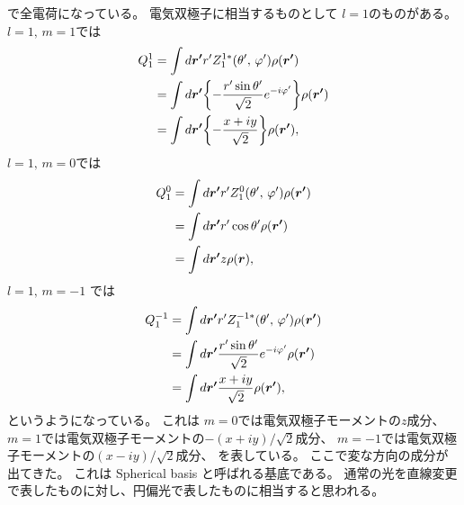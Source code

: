 \documentclass[../../master.tex]{subfiles}
\begin{document}
で全電荷になっている。
電気双極子に相当するものとして
\(l=1\)のものがある。
\(l=1,\,m = 1\)では
\begin{equation}\begin{aligned}[b]
     Q_1^{ 1}
    &= \int d\vb*{r'}  r' Z_1^{1*} (\theta',\,\varphi') \rho(\vb*{r'})\\
    &= \int d\vb*{r'} \qty{- \frac{r'\sin\theta'}{\sqrt{2}}e^{- i\varphi'}} \rho(\vb*{r'})\\
    &= \int d\vb*{r'} \qty{- \frac{x+iy}{\sqrt{2}}} \rho(\vb*{r'}),
\end{aligned}\end{equation}
\(l=1,\,m=0\)では
\begin{equation}\begin{aligned}[b]
    Q_1^0
    &= \int d\vb*{r'}  r' Z_1^0 (\theta',\,\varphi') \rho(\vb*{r'})\\
    &= \int d\vb*{r'}  r' \cos\theta' \rho(\vb*{r'})\\
    &= \int d\vb*{r'} z \rho(\vb*{r}),
\end{aligned}\end{equation}
\(l=1,\,m=-1\) では
\begin{equation}\begin{aligned}[b]
    Q_1^{- 1}
    &= \int d\vb*{r'}  r' Z_1^{- 1*} (\theta',\,\varphi') \rho(\vb*{r'})\\
    &= \int d\vb*{r'} \frac{r'\sin\theta'}{\sqrt{2}}e^{- i\varphi'} \rho(\vb*{r'})\\
    &= \int d\vb*{r'} \frac{x+iy}{\sqrt{2}} \rho(\vb*{r'}),
\end{aligned}\end{equation}
というようになっている。
これは
\(m=0\)では電気双極子モーメントの\(z\)成分、
\(m=1\)では電気双極子モーメントの\(-(x+iy)/\sqrt{2}\)成分、
\(m=-1\)では電気双極子モーメントの\((x-iy)/\sqrt{2}\)成分、
を表している。
ここで変な方向の成分が出てきた。
これは Spherical basis と呼ばれる基底である。
通常の光を直線変更で表したものに対し、円偏光で表したものに相当すると思われる。

\end{document}

